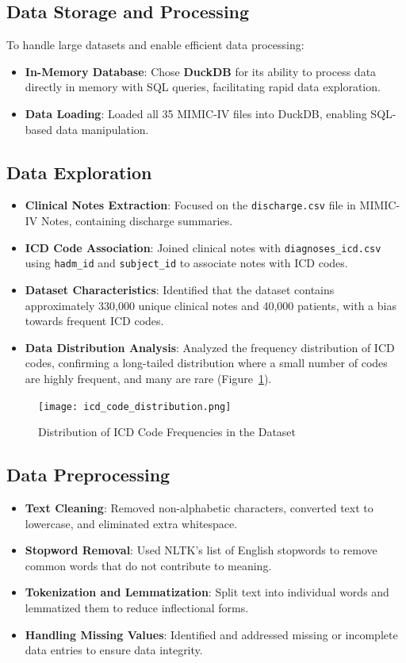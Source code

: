 \documentclass[12pt,a4paper]{report}
\begin{document}
\subsection{Data Storage and Processing}
To handle large datasets and enable efficient data processing:
\begin{itemize}
    \item \textbf{In-Memory Database}: Chose \textbf{DuckDB} for its ability to process data directly in memory with SQL queries, facilitating rapid data exploration.
    \item \textbf{Data Loading}: Loaded all 35 MIMIC-IV files into DuckDB, enabling SQL-based data manipulation.
\end{itemize}

\subsection{Data Exploration}
\begin{itemize}
    \item \textbf{Clinical Notes Extraction}: Focused on the \texttt{discharge.csv} file in MIMIC-IV Notes, containing discharge summaries.
    \item \textbf{ICD Code Association}: Joined clinical notes with \texttt{diagnoses\_icd.csv} using \texttt{hadm\_id} and \texttt{subject\_id} to associate notes with ICD codes.
    \item \textbf{Dataset Characteristics}: Identified that the dataset contains approximately 330,000 unique clinical notes and 40,000 patients, with a bias towards frequent ICD codes.
    \item \textbf{Data Distribution Analysis}: Analyzed the frequency distribution of ICD codes, confirming a long-tailed distribution where a small number of codes are highly frequent, and many are rare (Figure~\ref{fig:icd_distribution}).
\end{itemize}

\begin{figure}[H]
    \centering
    \texttt{[image: icd\_code\_distribution.png]}
    \caption{Distribution of ICD Code Frequencies in the Dataset}
    \label{fig:icd_distribution}
\end{figure}

\subsection{Data Preprocessing}
\begin{itemize}
    \item \textbf{Text Cleaning}: Removed non-alphabetic characters, converted text to lowercase, and eliminated extra whitespace.
    \item \textbf{Stopword Removal}: Used NLTK's list of English stopwords to remove common words that do not contribute to meaning.
    \item \textbf{Tokenization and Lemmatization}: Split text into individual words and lemmatized them to reduce inflectional forms.
    \item \textbf{Handling Missing Values}: Identified and addressed missing or incomplete data entries to ensure data integrity.
\end{itemize}
\end{document}
